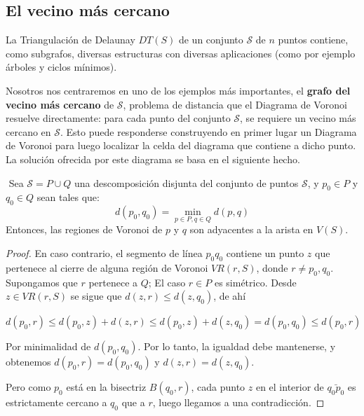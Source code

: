 \subsection{El vecino más cercano}

La Triangulación de Delaunay $DT(S)$ de un conjunto $\mathcal{S}$ de $n$ puntos contiene, como subgrafos, diversas estructuras con diversas aplicaciones (como por ejemplo árboles y ciclos mínimos). 
\vspace{0.3cm} 

Nosotros nos centraremos en uno de los ejemplos más importantes, el \textbf{grafo del vecino más cercano}\label{vecino} de $\mathcal{S}$, problema de distancia que el Diagrama de Voronoi resuelve directamente: para cada punto del conjunto $\mathcal{S}$, se requiere un vecino más cercano en $\mathcal{S}$. Esto puede responderse construyendo en primer lugar un Diagrama de Voronoi para luego localizar la celda del diagrama que contiene a dicho punto.
La solución ofrecida por este diagrama se basa en el siguiente hecho.

\begin{lema}$\label{lema32}$
    Sea $\mathcal{S}=P\cup Q$ una descomposición disjunta del conjunto de puntos $\mathcal{S}$, y $p_{0} \in P$ y $q_{0} \in Q$ sean tales que: \begin{equation}d(p_{0},q_{0})= \min_{p\in P, q\in Q} d(p,q) \end{equation}
    Entonces, las regiones de Voronoi de $p$ y $q$ son adyacentes a la arista en $V(S)$.
\end{lema}
\begin{proof}
    En caso contrario, el segmento de línea $p_{0}q_{0}$ contiene un punto $z$ que pertenece al cierre de alguna región de Voronoi $VR(r, S)$, donde $r \not= p_{0},q_{0}$. Supongamos que $r$ pertenece a $Q$; El caso $r \in P$ es simétrico. 
    Desde $z \in VR(r,S)$ se sigue que $d(z,r)\leq d(z,q_{0})$, de ahí
    \vspace{0.3cm}
    
    $d(p_{0},r)\leq d(p_{0},z)+d(z,r) \leq d(p_{0},z)+d(z,q_{0})=d(p_{0},q_{0})\leq d(p_{0},r)$
    \vspace{0.3cm}
      
    Por minimalidad de $d(p_{0},q_{0})$. Por lo tanto, la igualdad debe mantenerse, y obtenemos $d(p_{0},r)=d(p_{0},q_{0})$ y $d(z,r)=d(z,q_{0})$.

    Pero como $p_{0}$ está en la bisectriz $B(q_{0},r)$, cada punto $z$ en el interior de $\bar{q_{0}p_{0}}$ es estrictamente cercano a $q_{0}$ que a $r$, luego llegamos a una contradicción.

\end{proof}
\vspace{0.3cm}

